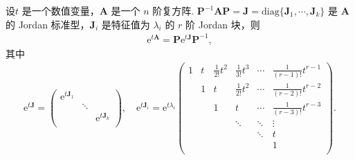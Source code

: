 \documentclass[../../main.tex]{subfiles}%
\begin{document}
\begin{proposition}\label{proposition:计算e^tA}
设$t$ 是一个数值变量，$\boldsymbol{A}$ 是一个 $n$ 阶复方阵.
$\boldsymbol{P}^{-1}\boldsymbol{A}\boldsymbol{P}=\boldsymbol{J}=\mathrm{diag}\{\boldsymbol{J}_1,\cdots,\boldsymbol{J}_k\}$ 是 $\boldsymbol{A}$ 的 Jordan 标准型，$\boldsymbol{J}_i$ 是特征值为 $\lambda_i$ 的 $r$ 阶 Jordan 块，则
\begin{align*}
\mathrm{e}^{t\boldsymbol{A}}=\boldsymbol{P}\mathrm{e}^{t\boldsymbol{J}}\boldsymbol{P}^{-1},
\end{align*}
其中
\begin{align*}
\mathrm{e}^{t\boldsymbol{J}}=\left( \begin{matrix}
\mathrm{e}^{t\boldsymbol{J}_1}&		&		\\
&		\ddots&		\\
&		&		\mathrm{e}^{t\boldsymbol{J}_k}\\
\end{matrix} \right) ,\quad \mathrm{e}^{t\boldsymbol{J}_i}=\mathrm{e}^{t\lambda _i}\left( \begin{matrix}
1&		t&		\frac{1}{2!}t^2&		\frac{1}{3!}t^3&		\cdots&		\frac{1}{(r-1)!}t^{r-1}\\
&		1&		t&		\frac{1}{2!}t^2&		\cdots&		\frac{1}{(r-2)!}t^{r-2}\\
&		&		1&		t&		\cdots&		\frac{1}{(r-3)!}t^{r-3}\\
&		&		&		\ddots&		\ddots&		\vdots\\
&		&		&		&		\ddots&		t\\
&		&		&		&		&		1\\
\end{matrix} \right) .
\end{align*}
\end{proposition}
\end{document}
